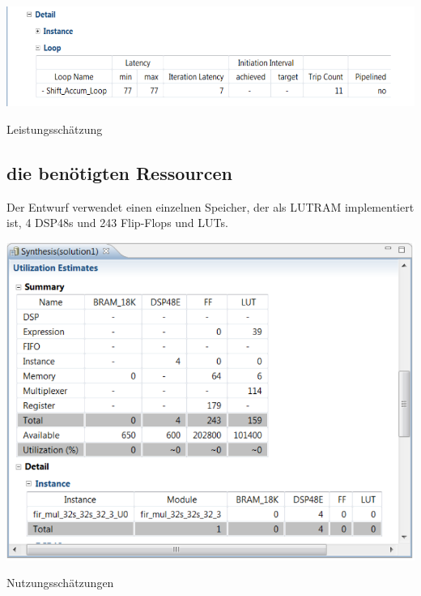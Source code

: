 \begin{minipage}{\textwidth}
    \begin{center}        
        \includegraphics[scale=0.7]{img/Latency.png} 
    \end{center}
\end{minipage}
\begin{center}
Leistungsschätzung
\end{center}

\subsection {die benötigten Ressourcen}
Der Entwurf verwendet einen einzelnen Speicher, der als LUTRAM implementiert ist, 4 DSP48s und  243 Flip-Flops und LUTs.\\

\begin{minipage}{\textwidth}
    \begin{center}        
        \includegraphics[scale=0.7]{img/Utilization.png} 
    \end{center}
\end{minipage}
\begin{center}
Nutzungsschätzungen
\end{center}



